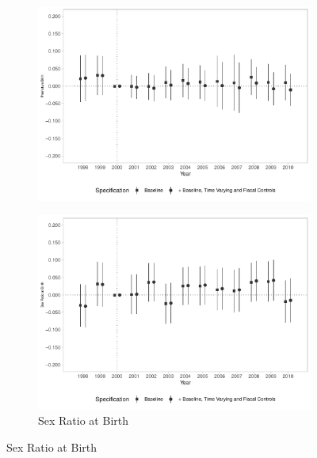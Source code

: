 \begin{figure}[h!]
\begin{center}
\begin{subfigure}{0.32\textwidth}
        \includegraphics[width=\textwidth]{plots/birth_premature_dist_ec29_baseline_dist_ec29_baseline_19.pdf}
    \end{subfigure}
    \begin{subfigure}{0.32\textwidth}
        \centering
        \caption{\scriptsize Sex Ratio at Birth}\label{fig:19f}
        \includegraphics[width=\textwidth]{plots/birth_sexratio_dist_ec29_baseline_dist_ec29_baseline_19.pdf}
    \end{subfigure}
    
    \end{center}
    
\end{figure}